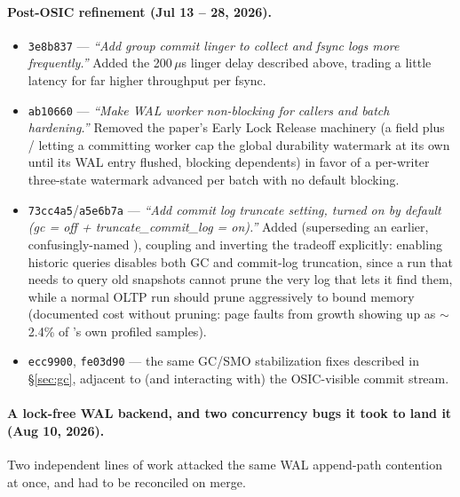 \documentclass[11pt]{article}
\newcommand{\commit}[1]{\texttt{#1}}
\begin{document}
\paragraph{Post-OSIC refinement (Jul 13 -- 28, 2026).}
\begin{itemize}
  \item \commit{3e8b837} --- \emph{``Add group commit linger to collect and fsync logs
        more frequently.''} Added the 200\,$\mu$s linger delay described above, trading a
        little latency for far higher throughput per fsync.
  \item \commit{ab10660} --- \emph{``Make WAL worker non-blocking for callers and batch
        hardening.''} Removed the paper's Early Lock Release machinery (a
         field plus / letting a
        committing worker cap the global durability watermark at its own
         until its WAL entry flushed, blocking dependents) in favor
        of a per-writer three-state watermark advanced per batch with no default
        blocking.
  \item \commit{73cc4a5}/\commit{a5e6b7a} --- \emph{``Add commit log truncate setting,
        turned on by default (gc = off + truncate\_commit\_log = on).''} Added
         (superseding an earlier,
        confusingly-named ), coupling and inverting
        the tradeoff explicitly: enabling historic queries disables both GC and
        commit-log truncation, since a run that needs to query old snapshots cannot
        prune the very log that lets it find them, while a normal OLTP run should prune
        aggressively to bound memory (documented cost without pruning: page faults from
         growth showing up as $\sim$2.4\% of 's own profiled
        samples).
  \item \commit{ecc9900}, \commit{fe03d90} --- the same GC/SMO stabilization fixes
        described in \S\ref{sec:gc}, adjacent to (and interacting with) the OSIC-visible
        commit stream.
\end{itemize}

\paragraph{A lock-free WAL backend, and two concurrency bugs it took to land it (Aug 10,
2026).} Two independent lines of work attacked the same WAL append-path contention at
once, and had to be reconciled on merge.
\end{document}
